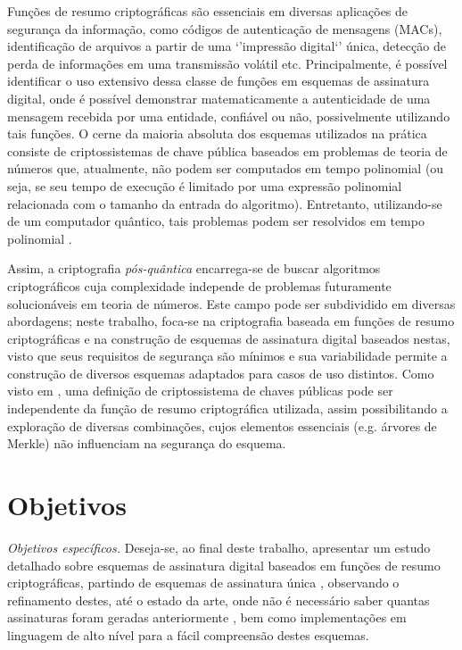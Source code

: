 \documentclass{ufsctex/ufsctex}
\begin{document}
Funções de resumo criptográficas são essenciais em diversas aplicações de
segurança da informação, como códigos de autenticação de mensagens (MACs),
identificação de arquivos a partir de uma `'impressão digital`' única, detecção
de perda de informações em uma transmissão volátil etc.  Principalmente, é
possível identificar o uso extensivo dessa classe de funções em esquemas de
assinatura digital, onde é possível demonstrar matematicamente a autenticidade
de uma mensagem recebida por uma entidade, confiável ou não, possivelmente
utilizando tais funções. O cerne da maioria absoluta dos esquemas utilizados na
prática consiste de criptossistemas de chave pública baseados em problemas de
teoria de números que, atualmente, não podem ser computados em tempo polinomial
(ou seja, se seu tempo de execução é limitado por uma expressão polinomial
relacionada com o tamanho da entrada do algoritmo). Entretanto, utilizando-se
de um computador quântico, tais problemas podem ser resolvidos em tempo
polinomial \cite{shor1999polynomial}.

Assim, a criptografia \emph{pós-quântica} encarrega-se de buscar algoritmos
criptográficos cuja complexidade independe de problemas futuramente
solucionáveis em teoria de números. Este campo pode ser subdividido em diversas
abordagens; neste trabalho, foca-se na criptografia baseada em funções de
resumo criptográficas e na construção de esquemas de assinatura digital
baseados nestas, visto que seus requisitos de segurança são mínimos e sua
variabilidade permite a construção de diversos esquemas adaptados para casos de
uso distintos. Como visto em \cite{Merkle1990}, uma definição de
criptossistema de chaves públicas pode ser independente da função de resumo
criptográfica utilizada, assim possibilitando a exploração de diversas
combinações, cujos elementos essenciais (e.g. árvores de Merkle) não
influenciam na segurança do esquema.

\section{Objetivos}

\noindent \emph{Objetivos específicos.} Deseja-se, ao final deste trabalho,
apresentar um estudo detalhado sobre esquemas de assinatura digital baseados
em funções de resumo criptográficas, partindo de esquemas de assinatura única
\cite{Lamport1979}, observando o refinamento destes, até o estado da arte, onde
não é necessário saber quantas assinaturas foram geradas anteriormente
\cite{Bernstein2015}, bem como implementações em linguagem de alto nível
para a fácil compreensão destes esquemas. \\
\end{document}
